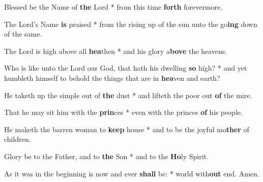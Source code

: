 \begin{multicols}{2}
	Blessed be the Name of \textbf{the} Lord * from this time \textbf{forth} forevermore.
	
	The Lord's Name \textbf{is} praised * from the rising up of the sun unto the go\textbf{ing} down of the same.
	
	The Lord is high above all \textbf{hea}then * and his glory a\textbf{bove} the heavens.
	
	Who is like unto the Lord our God, that hath his dwelling \textbf{so} high? * and yet humbleth himself to behold the things that are in \textbf{hea}ven and earth?
	
	He taketh up the simple out of \textbf{the} dust * and lifteth the poor out \textbf{of} the mire.
	
	That he may sit him with the \textbf{prin}ces * even with the princes \textbf{of} his people.
	
	He maketh the barren woman to \textbf{keep} house * and to be the joyful mo\textbf{ther} of children.
	
	Glory be to the Father, and to \textbf{the} Son * and to the \textbf{Ho}ly Spirit.
	
	As it was in the beginning is now and ever \textbf{shall} be: * world with\textbf{out} end. Amen.
\end{multicols}